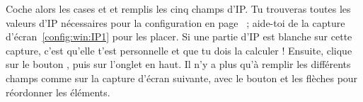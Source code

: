 Coche alors les cases  et  et remplis les cinq champs d'IP. Tu trouveras toutes les valeurs d'IP nécessaires pour la configuration en page~\pageref{tableau:mon_IP} ; aide-toi de la capture d'écran~\ref{config:win:IP1} pour les placer. Si une partie d'IP est blanche sur cette capture, c'est qu'elle t'est personnelle et que tu dois la calculer !
Ensuite, clique sur le bouton , puis sur l'onglet
 en haut.
Il n'y a plus qu'à remplir les différents champs comme sur la
capture d'écran suivante, avec le bouton  et les
flèches pour réordonner les éléments.







